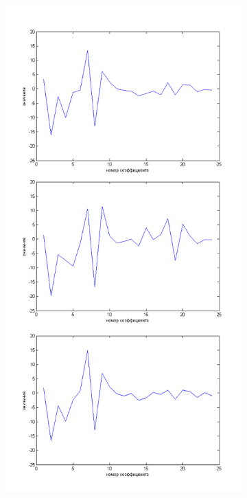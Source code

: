 \documentclass[a4paper,14pt,russian,utf8,nocolumnsxix,nocolumnxxxi,nocolumnxxxii]{eskdtext}
\begin{document}
\begin{figure}[!ht]
	\centering
	\begin{subfigure}{0.49\textwidth}
	\centering
	\includegraphics[width=.99\textwidth]{a_mfcc.png}

\end{subfigure}
\end{figure}
\end{document}
